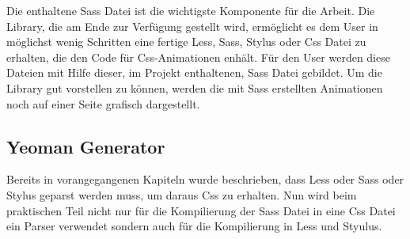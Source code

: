 Die enthaltene Sass Datei ist die wichtigste Komponente für die Arbeit. Die Library, die am  Ende zur Verfügung gestellt wird, ermöglicht es dem User in möglichst wenig Schritten eine fertige Less, Sass, Stylus oder Css Datei zu erhalten, die den Code für Css-Animationen enhält. Für den User werden diese Dateien mit Hilfe dieser, im Projekt enthaltenen, Sass Datei gebildet.\newline
Um die Library gut vorstellen zu können, werden die mit Sass erstellten Animationen noch auf einer Seite grafisch dargestellt.\newline

\subsection{Yeoman Generator}

Bereits in vorangegangenen Kapiteln wurde beschrieben, dass Less oder Sass oder Stylus geparst werden muss, um daraus Css zu erhalten. Nun wird beim praktischen Teil nicht nur für die Kompilierung der Sass Datei in eine Css Datei ein Parser verwendet sondern auch für die Kompilierung in Less und Styulus.

